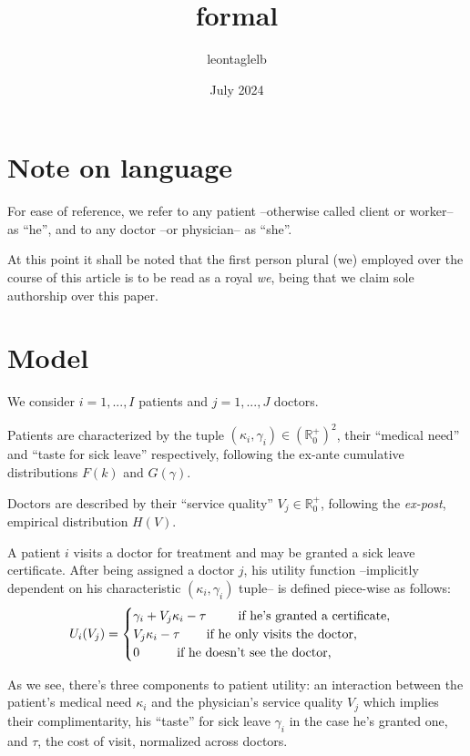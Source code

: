 \documentclass{article}
\title{formal}
\author{leontaglelb }
\date{July 2024}
\begin{document}
\section{Note on language}

For ease of reference, we refer to any patient --otherwise called client or worker-- as ``he'', and to any doctor --or physician-- as ``she''.

At this point it shall be noted that the first person plural (we) employed over the course of this article is to be read as a royal \textit{we}, being that we claim sole authorship over this paper.


\section{Model}

We consider $i = 1, ..., I$ patients and $j = 1, ..., J$ doctors.

Patients are characterized by the tuple $(\kappa_i,\gamma_i) \in (\mathbb{R}_0^+)^2$, their ``medical need'' and ``taste for sick leave'' respectively, following the ex-ante cumulative distributions $F(k)$ and $G(\gamma)$.

Doctors are described by their ``service quality'' $V_j \in \mathbb{R}_0^+$, following the \textit{ex-post}, empirical distribution $H(V)$.

A patient $i$ visits a doctor for treatment and may be granted a sick leave certificate. After being assigned a doctor $j$, his utility function --implicitly dependent on his characteristic $(\kappa_i,\gamma_i)$ tuple-- is defined piece-wise as follows:
    \[
U_i(V_j) =\begin{cases}
\gamma_i + V_j \kappa_i - \tau \text{  \hspace{0.65cm} if he’s granted a certificate,} \\
V_j \kappa_i - \tau \text{  \hspace{0.5cm} if he only visits the doctor,} \\
0 \text{  \hspace{0.8cm} if he doesn't see the doctor,}
\end{cases}
\]

As we see, there's three components to patient utility: an interaction between the patient's medical need $\kappa_i$ and the physician's service quality $V_j$ which implies their complimentarity, his ``taste'' for sick leave $\gamma_i$ in the case he’s granted one, and $\tau$, the cost of visit, normalized across doctors.
\end{document}
